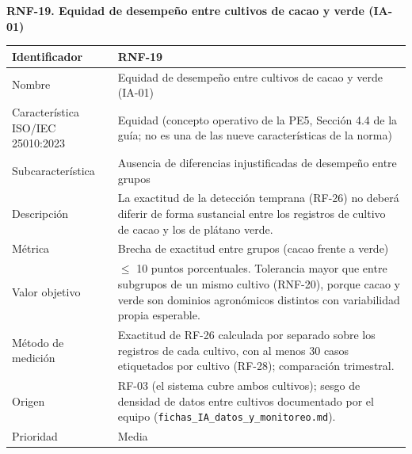 \documentclass[12pt,a4paper]{article}
\begin{document}
\begin{minipage}{\linewidth}
\bigskip
\noindent\textbf{RNF-19. Equidad de desempeño entre cultivos de cacao y verde (IA-01)}
\label{tab:RNF-19}

\begin{center}
\begin{tabular}{|p{4.2cm}|p{10cm}|}
\hline
Identificador & RNF-19 \\
\hline
Nombre & Equidad de desempeño entre cultivos de cacao y verde (IA-01) \\
\hline
Característica ISO/IEC 25010:2023 & Equidad (concepto operativo de la PE5, Sección 4.4 de la guía; no es una de las nueve características de la norma) \\
\hline
Subcaracterística & Ausencia de diferencias injustificadas de desempeño entre grupos \\
\hline
Descripción & La exactitud de la detección temprana (RF-26) no deberá diferir de forma sustancial entre los registros de cultivo de cacao y los de plátano verde. \\
\hline
Métrica & Brecha de exactitud entre grupos (cacao frente a verde) \\
\hline
Valor objetivo & $\leq$ 10 puntos porcentuales. Tolerancia mayor que entre subgrupos de un mismo cultivo (RNF-20), porque cacao y verde son dominios agronómicos distintos con variabilidad propia esperable. \\
\hline
Método de medición & Exactitud de RF-26 calculada por separado sobre los registros de cada cultivo, con al menos 30 casos etiquetados por cultivo (RF-28); comparación trimestral. \\
\hline
Origen & RF-03 (el sistema cubre ambos cultivos); sesgo de densidad de datos entre cultivos documentado por el equipo (\texttt{fichas\_IA\_datos\_y\_monitoreo.md}). \\
\hline
Prioridad & Media \\
\hline
\end{tabular}
\end{center}
\end{minipage}
\end{document}
